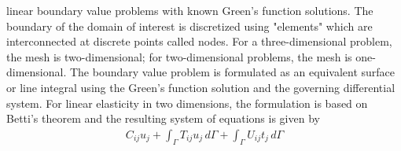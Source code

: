 \documentclass[12pt]{article}
\begin{document}
linear boundary value problems with known Green's function solutions. The boundary of the
domain of interest is discretized using "elements" which are interconnected at discrete points called
nodes. For a three-dimensional problem, the mesh is two-dimensional; for two-dimensional
problems, the mesh is one-dimensional. The boundary value problem is formulated as an equivalent
surface or line integral using the Green's function solution and the governing differential system.
For linear elasticity in two dimensions, the formulation is based on Betti's theorem and the resulting
system of equations is given by
\begin{align*}
    C_{ij}u_j + \int_{\varGamma} T_{ij}u_j  \,d\varGamma + \int_{\varGamma} U_{ij}t_j  \,d\varGamma \tag{13} \label{13}
\end{align*}
\end{document}

